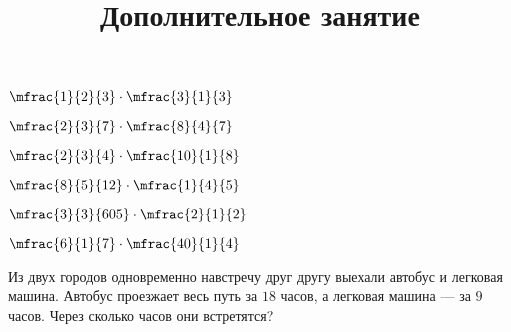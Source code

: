 \begin{homework}[number=2]
\begin{listofex}
\begin{enumcols}[columns=3]
			\item \(\mfrac{1}{2}{3}\cdot\mfrac{3}{1}{3} \)
			\item \(\mfrac{2}{3}{7}\cdot\mfrac{8}{4}{7} \)
			\item \( \mfrac{2}{3}{4}\cdot\mfrac{10}{1}{8}\)
			\item \( \mfrac{8}{5}{12}\cdot\mfrac{1}{4}{5}\)
			\item \( \mfrac{3}{3}{605}\cdot\mfrac{2}{1}{2} \)
			\item \( \mfrac{6}{1}{7}\cdot\mfrac{40}{1}{4}\)
		\end{enumcols}
	\item Из двух городов одновременно навстречу друг другу выехали автобус и легковая
	машина. Автобус проезжает весь путь за \( 18 \) часов, а легковая машина --- за \( 9 \) часов. Через сколько часов они встретятся?
	\end{listofex}
\end{homework}
%	
%	
%	
%	
%	
%	
%	
%	
\newpage
\title{Дополнительное занятие}
